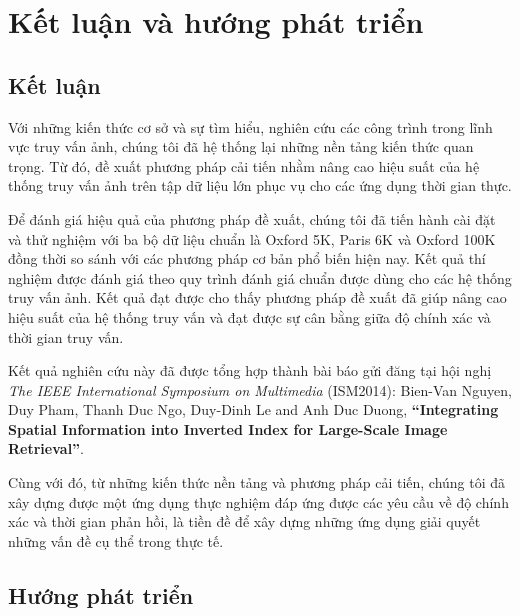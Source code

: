 \def\baselinestretch{1}
\chapter{Kết luận và hướng phát triển}
\label{chapter:summarize}
\ifpdf
    \graphicspath{{Conclusions/ConclusionsFigs/PNG/}{Conclusions/ConclusionsFigs/PDF/}{Conclusions/ConclusionsFigs/}}
\else
    \graphicspath{{Conclusions/ConclusionsFigs/EPS/}{Conclusions/ConclusionsFigs/}}
\fi

\section{Kết luận}
Với những kiến thức cơ sở và sự tìm hiểu, nghiên cứu các công trình trong lĩnh vực truy vấn ảnh, chúng tôi đã hệ thống lại những nền tảng kiến thức quan trọng. Từ đó, đề xuất phương pháp cải tiến nhằm nâng cao hiệu suất của hệ thống truy vấn ảnh trên tập dữ liệu lớn phục vụ cho các ứng dụng thời gian thực.

Để đánh giá hiệu quả của phương pháp đề xuất, chúng tôi đã tiến hành cài đặt và thử nghiệm với ba bộ dữ liệu chuẩn là Oxford 5K, Paris 6K và Oxford 100K đồng thời so sánh với các phương pháp cơ bản phổ biến hiện nay. Kết quả thí nghiệm được đánh giá theo quy trình đánh giá chuẩn được dùng cho các hệ thống truy vấn ảnh. Kết quả đạt được cho thấy phương pháp đề xuất đã giúp nâng cao hiệu suất của hệ thống truy vấn và đạt được sự cân bằng giữa độ chính xác và thời gian truy vấn.

Kết quả nghiên cứu này đã được tổng hợp thành bài báo gửi đăng tại hội nghị \textit{The IEEE International Symposium on Multimedia} (ISM2014):  Bien-Van Nguyen, Duy Pham, Thanh Duc Ngo, Duy-Dinh Le and Anh Duc Duong, \textbf{``Integrating Spatial Information into Inverted Index for Large-Scale Image Retrieval''}.

Cùng với đó, từ những kiến thức nền tảng và phương pháp cải tiến, chúng tôi đã xây dựng được một ứng dụng thực nghiệm đáp ứng được các yêu cầu về độ chính xác và thời gian phản hồi, là tiền đề để xây dựng những ứng dụng giải quyết những vấn đề cụ thể trong thực tế.


\section{Hướng phát triển}
